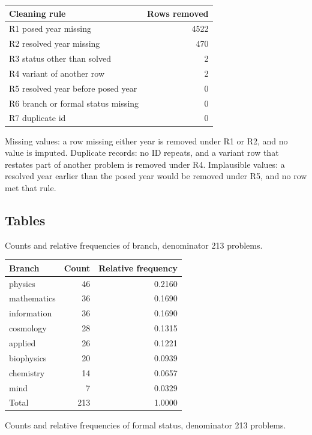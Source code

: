 \documentclass[11pt]{article}
\begin{document}
\begin{center}\begin{tabular}{lr}
\toprule
Cleaning rule & Rows removed \\
\midrule
R1 posed year missing & 4522 \\
R2 resolved year missing & 470 \\
R3 status other than solved & 2 \\
R4 variant of another row & 2 \\
R5 resolved year before posed year & 0 \\
R6 branch or formal status missing & 0 \\
R7 duplicate id & 0 \\
\bottomrule
\end{tabular}\end{center}

Missing values: a row missing either year is removed under R1 or R2, and no value is imputed. Duplicate records: no ID repeats, and a variant row that restates part of another problem is removed under R4. Implausible values: a resolved year earlier than the posed year would be removed under R5, and no row met that rule.

\subsection{Tables}

Counts and relative frequencies of branch, denominator 213 problems.

\begin{center}\begin{tabular}{lrr}
\toprule
Branch & Count & Relative frequency \\
\midrule
physics & 46 & 0.2160 \\
mathematics & 36 & 0.1690 \\
information & 36 & 0.1690 \\
cosmology & 28 & 0.1315 \\
applied & 26 & 0.1221 \\
biophysics & 20 & 0.0939 \\
chemistry & 14 & 0.0657 \\
mind & 7 & 0.0329 \\
Total & 213 & 1.0000 \\
\bottomrule
\end{tabular}\end{center}

Counts and relative frequencies of formal status, denominator 213 problems.
\end{document}
